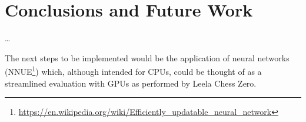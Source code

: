 \chapter{Conclusions and Future Work}
\label{cap:conclusiones}

\dots

The next steps to be implemented would be the application of neural networks (NNUE\footnote{\url{https://en.wikipedia.org/wiki/Efficiently_updatable_neural_network}}) which, although intended for CPUs, could be thought of as a streamlined evaluation with GPUs as performed by Leela Chess Zero.
